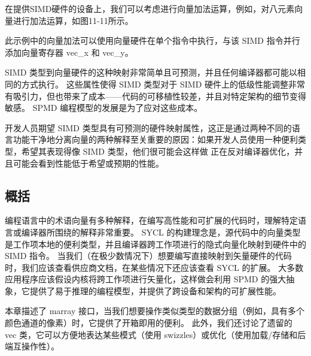 在提供SIMD硬件的设备上，我们可以考虑进行向量加法运算，例如，对八元素向量进行加法运算，如图11-11所示。

此示例中的向量加法可以使用向量硬件在单个指令中执行，与该 SIMD 指令并行添加向量寄存器 vec\_x 和 vec\_y。

SIMD 类型到向量硬件的这种映射非常简单且可预测，并且任何编译器都可能以相同的方式执行。 这些属性使得 SIMD 类型对于 SIMD 硬件上的低级性能调整非常有吸引力，但也带来了成本——代码的可移植性较差，并且对特定架构的细节变得敏感。 SPMD 编程模型的发展是为了应对这些成本。

开发人员期望 SIMD 类型具有可预测的硬件映射属性，这正是通过两种不同的语言功能干净地分离向量的两种解释至关重要的原因：如果开发人员使用一种便利类型，希望其表现得像 SIMD 类型，他们很可能会这样做 正在反对编译器优化，并且可能会看到性能低于希望或预期的性能。

\subsection{概括}
编程语言中的术语向量有多种解释，在编写高性能和可扩展的代码时，理解特定语言或编译器所围绕的解释非常重要。 SYCL 的构建理念是，源代码中的向量类型是工作项本地的便利类型，并且编译器跨工作项进行的隐式向量化映射到硬件中的 SIMD 指令。 当我们（在极少数情况下）想要编写直接映射到矢量硬件的代码时，我们应该查看供应商文档，在某些情况下还应该查看 SYCL 的扩展。 大多数应用程序应该假设内核将跨工作项进行矢量化，这样做会利用 SPMD 的强大抽象，它提供了易于推理的编程模型，并提供了跨设备和架构的可扩展性能。

本章描述了 marray 接口，当我们想要操作类似类型的数据分组（例如，具有多个颜色通道的像素）时，它提供了开箱即用的便利。 此外，我们还讨论了遗留的 vec 类，它可以方便地表达某些模式（使用 swizzles）或优化（使用加载/存储和后端互操作性）。